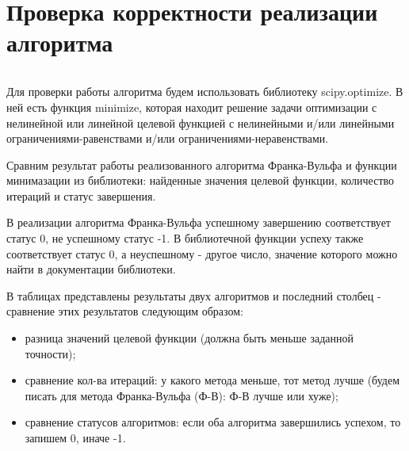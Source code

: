 \documentclass{article}
\begin{document}
\newpage
\section{Проверка корректности реализации алгоритма}
$  $

Для проверки работы алгоритма будем использовать библиотеку scipy.optimize. В ней есть функция minimize, которая находит решение задачи оптимизации с нелинейной или линейной целевой функцией с нелинейными и/или линейными ограничениями-равенствами и/или ограничениями-неравенствами.

Сравним результат работы реализованного алгоритма Франка-Вульфа и функции минимазации из библиотеки: найденные значения целевой функции, количество итераций и статус завершения.

В реализации алгоритма Франка-Вульфа успешному завершению соответствует статус 0, не успешному статус -1. В библиотечной функции успеху также соответствует статус 0, а неуспешному - другое число, значение которого можно найти в документации библиотеки.

В таблицах представлены результаты двух алгоритмов и последний столбец - сравнение этих результатов следующим  образом: 
\begin{itemize}
\item
разница значений целевой функции (должна быть меньше заданной точности);
\item
сравнение кол-ва итераций: у какого метода меньше, тот метод лучше (будем писать для метода Франка-Вульфа (Ф-В): Ф-В лучше или хуже);
\item
сравнение статусов алгоритмов: если оба алгоритма завершились успехом, то запишем 0, иначе -1.
\end{itemize}
\end{document}
